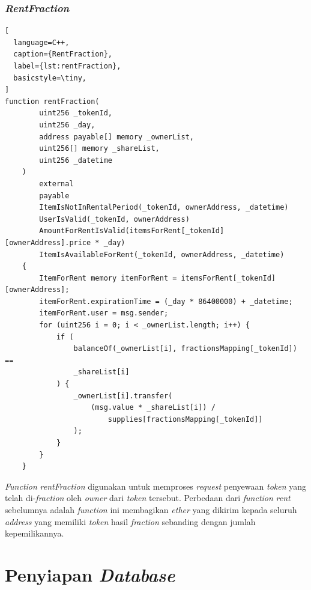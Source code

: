 \subsubsection{\emph{RentFraction}}

\begin{lstlisting}[
  language=C++,
  caption={RentFraction},
  label={lst:rentFraction},
  basicstyle=\tiny,
]
function rentFraction(
        uint256 _tokenId,
        uint256 _day,
        address payable[] memory _ownerList,
        uint256[] memory _shareList,
        uint256 _datetime
    )
        external
        payable
        ItemIsNotInRentalPeriod(_tokenId, ownerAddress, _datetime)
        UserIsValid(_tokenId, ownerAddress)
        AmountForRentIsValid(itemsForRent[_tokenId][ownerAddress].price * _day)
        ItemIsAvailableForRent(_tokenId, ownerAddress, _datetime)
    {
        ItemForRent memory itemForRent = itemsForRent[_tokenId][ownerAddress];
        itemForRent.expirationTime = (_day * 86400000) + _datetime;
        itemForRent.user = msg.sender;
        for (uint256 i = 0; i < _ownerList.length; i++) {
            if (
                balanceOf(_ownerList[i], fractionsMapping[_tokenId]) ==
                _shareList[i]
            ) {
                _ownerList[i].transfer(
                    (msg.value * _shareList[i]) /
                        supplies[fractionsMapping[_tokenId]]
                );
            }
        }
    }
\end{lstlisting}

\emph{Function} \emph{rentFraction} digunakan untuk memproses \emph{request} penyewaan \emph{token} yang telah di-\emph{fraction} oleh \emph{owner} dari \emph{token} tersebut. Perbedaan dari \emph{function} \emph{rent} sebelumnya adalah \emph{function} ini membagikan \emph{ether} yang dikirim kepada seluruh \emph{address} yang memiliki \emph{token} hasil \emph{fraction} sebanding dengan jumlah kepemilikannya.

\section{Penyiapan \emph{Database}}

